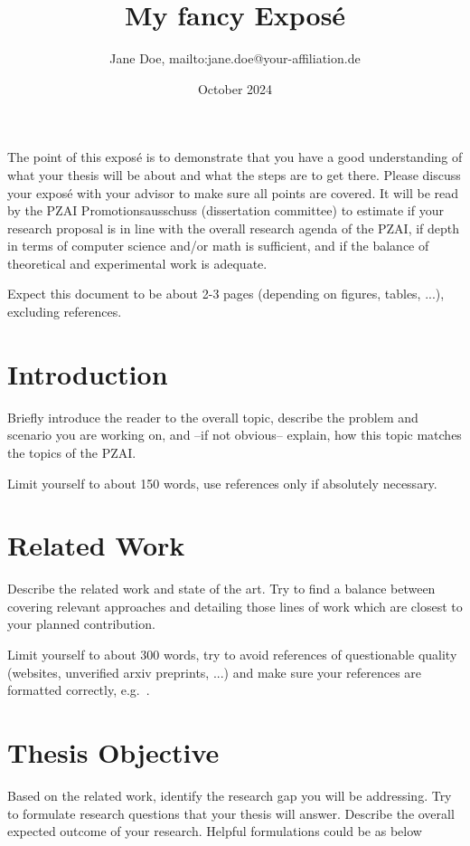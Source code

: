 \documentclass[11pt,DIV=16,parskip=half]{scrartcl}
\title{My fancy Exposé}
\author{Jane Doe, mailto:jane.doe@your-affiliation.de}
\date{October 2024}
\begin{document}
\maketitle

The point of this exposé is to demonstrate that you have a good understanding of what your thesis will be about and what the steps are to get there.
Please discuss your exposé with your advisor to make sure all points are covered.
It will be read by the PZAI Promotionsausschuss (dissertation committee) to estimate if your research proposal is in line with the overall research agenda of the PZAI, if depth in terms of computer science and/or math is sufficient, and if the balance of theoretical and experimental work is adequate.

Expect this document to be about 2-3 pages (depending on figures, tables, ...), excluding references.


\section{Introduction}
Briefly introduce the reader to the overall topic, describe the problem and scenario you are working on, and --if not obvious-- explain, how this topic matches the topics of the PZAI.

Limit yourself to about 150 words, use references only if absolutely necessary.



\section{Related Work}
Describe the related work and state of the art.
Try to find a balance between covering relevant approaches and detailing those lines of work which are closest to your planned contribution.

Limit yourself to about 300 words, try to avoid references of questionable quality (websites, unverified arxiv preprints, ...) and make sure your references are formatted correctly, e.g.~\cite{cooley1965-fft}.



\section{Thesis Objective}
Based on the related work, identify the research gap you will be addressing.
Try to formulate research questions that your thesis will answer.
Describe the overall expected outcome of your research.
Helpful formulations could be as below
\end{document}
